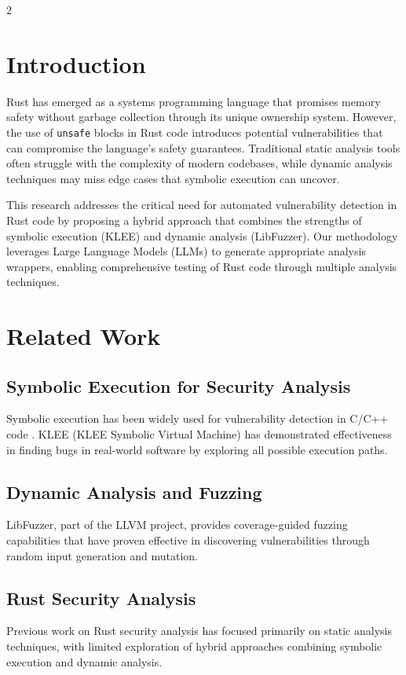 \documentclass[12pt,a4paper]{article}
\begin{document}
\begin{multicols}{2}
\section{Introduction}

Rust has emerged as a systems programming language that promises memory safety without garbage collection through its unique ownership system. However, the use of \texttt{unsafe} blocks in Rust code introduces potential vulnerabilities that can compromise the language's safety guarantees. Traditional static analysis tools often struggle with the complexity of modern codebases, while dynamic analysis techniques may miss edge cases that symbolic execution can uncover.

This research addresses the critical need for automated vulnerability detection in Rust code by proposing a hybrid approach that combines the strengths of symbolic execution (KLEE) and dynamic analysis (LibFuzzer). Our methodology leverages Large Language Models (LLMs) to generate appropriate analysis wrappers, enabling comprehensive testing of Rust code through multiple analysis techniques.

\section{Related Work}

\subsection{Symbolic Execution for Security Analysis}
Symbolic execution has been widely used for vulnerability detection in C/C++ code \cite{klee2008}. KLEE (KLEE Symbolic Virtual Machine) has demonstrated effectiveness in finding bugs in real-world software by exploring all possible execution paths.

\subsection{Dynamic Analysis and Fuzzing}
LibFuzzer, part of the LLVM project, provides coverage-guided fuzzing capabilities that have proven effective in discovering vulnerabilities through random input generation and mutation.

\subsection{Rust Security Analysis}
Previous work on Rust security analysis has focused primarily on static analysis techniques, with limited exploration of hybrid approaches combining symbolic execution and dynamic analysis.


\end{multicols}
\end{document}
